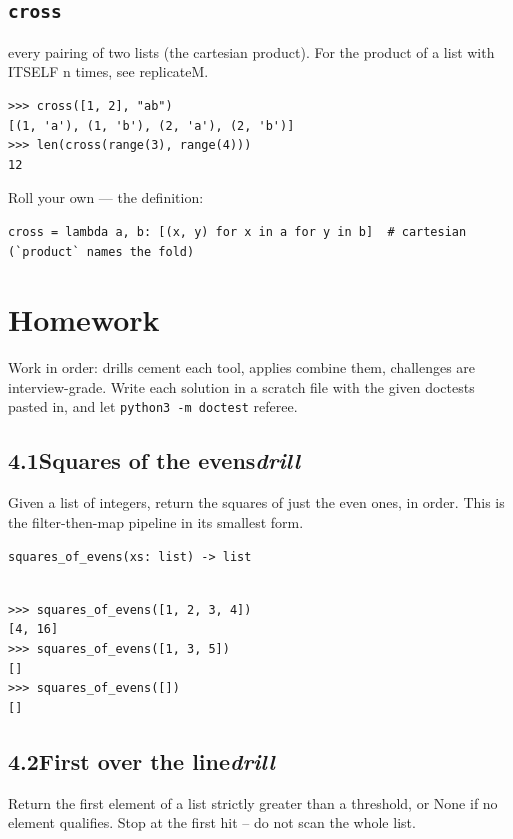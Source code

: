 \documentclass[10pt,letterpaper]{book}
\begin{document}
\subsection{\texttt{cross}}\label{def:cross}
every pairing of two lists (the cartesian product). For the product of a list with ITSELF n times, see replicateM.
\begin{lstlisting}[style=ex]
>>> cross([1, 2], "ab")
[(1, 'a'), (1, 'b'), (2, 'a'), (2, 'b')]
>>> len(cross(range(3), range(4)))
12
\end{lstlisting}

Roll your own --- the definition:

\begin{lstlisting}[style=ex]
cross = lambda a, b: [(x, y) for x in a for y in b]  # cartesian (`product` names the fold)
\end{lstlisting}

\section{Homework}
Work in order: drills cement each tool, applies combine them,
challenges are interview-grade. Write each solution in a scratch file with
the given doctests pasted in, and let \texttt{python3 -m doctest} referee.
\subsection*{4.1\quad Squares of the evens\hfill\textnormal{\textit{drill}}}
Given a list of integers, return the squares of just the even ones, in order. This is the filter-then-map pipeline in its smallest form.

\noindent\texttt{squares\_of\_evens(xs: list) -> list}
\begin{lstlisting}[style=ex]

>>> squares_of_evens([1, 2, 3, 4])
[4, 16]
>>> squares_of_evens([1, 3, 5])
[]
>>> squares_of_evens([])
[]

\end{lstlisting}
\subsection*{4.2\quad First over the line\hfill\textnormal{\textit{drill}}}
Return the first element of a list strictly greater than a threshold, or None if no element qualifies. Stop at the first hit -- do not scan the whole list.
\end{document}
